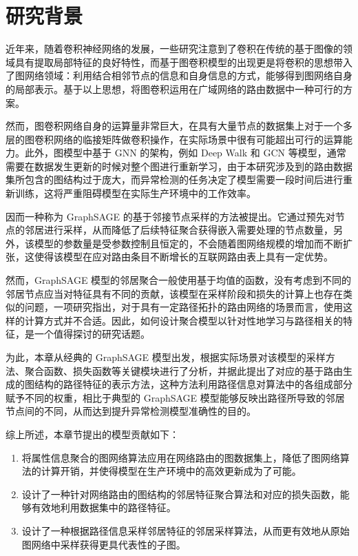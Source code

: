 \section{研究背景}


近年来，随着卷积神经网络的发展，一些研究注意到了卷积在传统的基于图像的领域具有提取局部特征的良好特性，而基于图卷积模型的出现更是将卷积的思想带入了图网络领域：利用结合相邻节点的信息和自身信息的方式，能够得到图网络自身的局部表示。基于以上思想，将图卷积运用在广域网络的路由数据中一种可行的方案。

然而，图卷积网络自身的运算量非常巨大，在具有大量节点的数据集上对于一个多层的图卷积网络的临接矩阵做卷积操作，在实际场景中很有可能超出可行的运算能力。此外，图模型中基于 GNN 的架构，例如 Deep Walk 和 GCN 等模型，通常需要在数据发生更新的时候对整个图进行重新学习，由于本研究涉及到的路由数据集所包含的图结构过于庞大，而异常检测的任务决定了模型需要一段时间后进行重新训练，这将严重阻碍模型在实际生产环境中的工作效率。

因而一种称为 GraphSAGE 的基于邻接节点采样的方法被提出。它通过预先对节点的邻居进行采样，从而降低了后续特征聚合获得嵌入需要处理的节点数量，另外，该模型的参数量是受参数控制且恒定的，不会随着图网络规模的增加而不断扩张，这使得该模型在应对路由条目不断增长的互联网路由表上具有一定优势。

然而，GraphSAGE 模型的邻居聚合一般使用基于均值的函数，没有考虑到不同的邻居节点应当对特征具有不同的贡献，该模型在采样阶段和损失的计算上也存在类似的问题，一项研究指出，对于具有一定路径拓扑的路由网络的场景而言，使用这样的计算方式并不合适。因此，如何设计聚合模型以针对性地学习与路径相关的特征，是一个值得探讨的研究话题。

为此，本章从经典的 GraphSAGE 模型出发，根据实际场景对该模型的采样方法、聚合函数、损失函数等关键模块进行了分析，并据此提出了对应的基于路由生成的图结构的路径特征的表示方法，这种方法利用路径信息对算法中的各组成部分赋予不同的权重，相比于典型的 GraphSAGE 模型能够反映出路径所导致的邻居节点间的不同，从而达到提升异常检测模型准确性的目的。

综上所述，本章节提出的模型贡献如下：

\begin{enumerate}
    \item 将属性信息聚合的图网络算法应用在网络路由的图数据集上，降低了图网络算法的计算开销，并使得模型在生产环境中的高效更新成为了可能。
    \item 设计了一种针对网络路由的图结构的邻居特征聚合算法和对应的损失函数，能够有效地利用数据集中的路径特征。
    \item 设计了一种根据路径信息采样邻居特征的邻居采样算法，从而更有效地从原始图网络中采样获得更具代表性的子图。
\end{enumerate}
